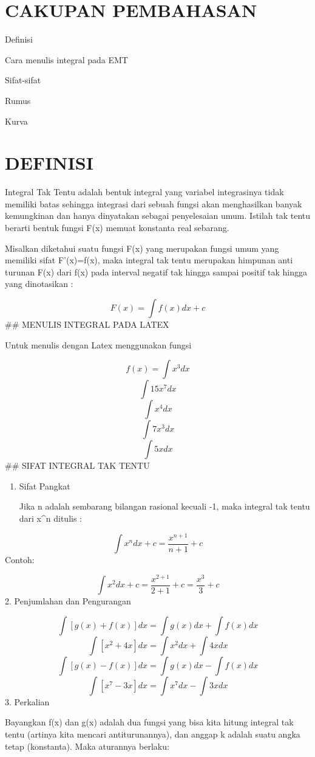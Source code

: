 \documentclass[
]{book}
\begin{document}
\section{CAKUPAN PEMBAHASAN}\label{cakupan-pembahasan}

Definisi

Cara menulis integral pada EMT

Sifat-sifat

Rumus

Kurva

\section{DEFINISI}\label{definisi}

Integral Tak Tentu adalah bentuk integral yang variabel integrasinya tidak memiliki batas sehingga integrasi dari sebuah fungsi akan menghasilkan banyak kemungkinan dan hanya dinyatakan sebagai penyelesaian umum. Istilah tak tentu berarti bentuk fungsi F(x) memuat konstanta real sebarang.

Misalkan diketahui suatu fungsi F(x) yang merupakan fungsi umum yang memiliki sifat F'(x)=f(x), maka integral tak tentu merupakan himpunan anti turunan F(x) dari f(x) pada interval negatif tak hingga sampai positif tak hingga yang dinotasikan :

\[F(x) = \int f(x) dx+c\]\#\# MENULIS INTEGRAL PADA LATEX

Untuk menulis dengan Latex menggunakan fungsi \int

\[f(x)= \int x^3 dx\]\[\int 15x^7 dx\]\[\int x^4 dx\]\[\int 7x^3 dx\]\[\int 5x dx\]\#\# SIFAT INTEGRAL TAK TENTU

\begin{enumerate}
\def\labelenumi{\arabic{enumi}.}
\item
  Sifat Pangkat

  Jika n adalah sembarang bilangan rasional kecuali -1, maka integral tak tentu dari x\^{}n ditulis :
\end{enumerate}

\[\int x^n dx+c=\frac{x^{n+1}}{n+1} +c\]Contoh:

\[\int x^2 dx+c=\frac{x^{2+1}}{2+1} +c =\frac{x^3}{3} +c\]2. Penjumlahan dan Pengurangan

\[\int[g(x)+f(x)]dx = \int g(x) dx + \int f(x)dx\]\[\int [x^2+4x] dx = \int x^2 dx + \int 4x dx\]\[\int[g(x)-f(x)]dx = \int g(x) dx - \int f(x)dx\]\[\int [x^7-3x] dx = \int x^7 dx - \int 3x dx\]3. Perkalian

Bayangkan f(x) dan g(x) adalah dua fungsi yang bisa kita hitung integral tak tentu (artinya kita mencari antiturunannya), dan anggap k adalah suatu angka tetap (konstanta). Maka aturannya berlaku:
\end{document}
